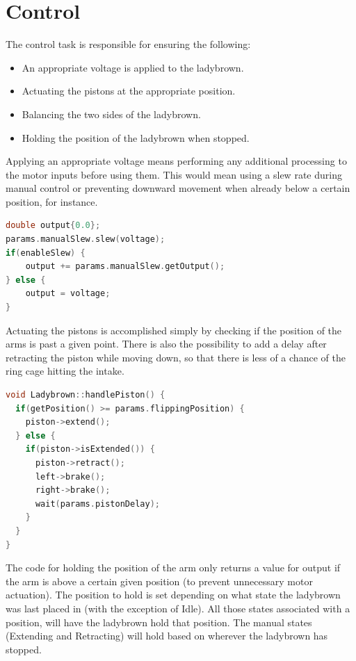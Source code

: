 \section{Control}
The control task is responsible for ensuring the following:
\begin{itemize}
    \item An appropriate voltage is applied to the ladybrown. 
    \item Actuating the pistons at the appropriate position. 
    \item Balancing the two sides of the ladybrown. 
    \item Holding the position of the ladybrown when stopped. 
\end{itemize}
Applying an appropriate voltage means performing any additional processing to the motor inputs before using them. This would mean using a slew rate during manual control or preventing downward movement when already below a certain position, for instance.
\begin{lstlisting}[language=C++]
double output{0.0};
params.manualSlew.slew(voltage);
if(enableSlew) {
    output += params.manualSlew.getOutput();
} else {
    output = voltage;
}
\end{lstlisting}

Actuating the pistons is accomplished simply by checking if the position of the arms is past a given point. There is also the possibility to add a delay after retracting the piston while moving down, so that there is less of a chance of the ring cage hitting the intake. 
\begin{lstlisting}[language=C++]
void Ladybrown::handlePiston() {
  if(getPosition() >= params.flippingPosition) {
    piston->extend();
  } else {
    if(piston->isExtended()) {
      piston->retract();
      left->brake();
      right->brake();
      wait(params.pistonDelay);
    }
  }
}
\end{lstlisting}

The code for holding the position of the arm only returns a value for output if the arm is above a certain given position (to prevent unnecessary motor actuation). The position to hold is set depending on what state the ladybrown was last placed in (with the exception of Idle). All those states associated with a position, will have the ladybrown hold that position. The manual states (Extending and Retracting) will hold based on wherever the ladybrown has stopped. 

